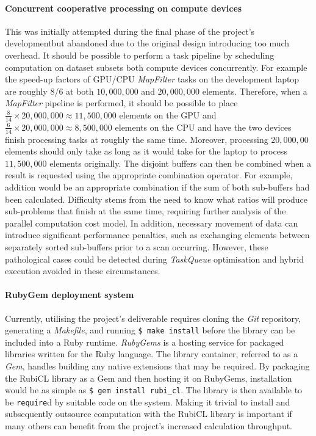 \paragraph*{Concurrent cooperative processing on compute devices} This was initially attempted during the final phase of the project's developmentbut abandoned due to the original design introducing too much overhead. It should be possible to perform a task pipeline by scheduling computation on dataset subsets both compute devices concurrently. For example the speed-up factors of \ac{GPU}/\ac{CPU} \emph{MapFilter} tasks on the development laptop are roughly $8$/$6$ at both $10,000,000$ and $20,000,000$ elements. Therefore, when a \emph{MapFilter} pipeline is performed, it should be possible to place $\frac{8}{14} \times 20,000,000 \approx 11,500,000$ elements on the \ac{GPU} and $\frac{6}{14} \times 20,000,000 \approx 8,500,000$ elements on the \ac{CPU} and have the two devices finish processing tasks at roughly the same time. Moreover, processing $20,000,00$ elements should only take as long as it would take for the laptop to process $11,500,000$ elements originally. The disjoint buffers can then be combined when a result is requested using the appropriate combination operator. For example, addition would be an appropriate combination if the sum of both sub-buffers had been calculated. Difficulty stems from the need to know what ratios will produce sub-problems that finish at the same time, requiring further analysis of the parallel computation cost model. In addition, necessary movement of data can introduce significant performance penalties, such as exchanging elements between separately sorted sub-buffers prior to a scan occurring. However, these pathological cases could be detected during \emph{TaskQueue} optimisation and hybrid execution avoided in these circumstances.

\paragraph*{RubyGem deployment system}
Currently, utilising the project's deliverable requires cloning the \emph{Git} repository, generating a \emph{Makefile}, and running \verb|$ make install| before the library can be included into a Ruby runtime.
\emph{RubyGems}\cite{rubygems} is a hosting service for packaged libraries written for the Ruby language. The library container, referred to as a \emph{Gem}, handles building any native extensions that may be required.
By packaging the RubiCL library as a Gem and then hosting it on RubyGems, installation would be as simple as \verb|$ gem install rubi_cl|. The library is then available to be \verb|require|d by suitable code on the system. Making it trivial to install and subsequently outsource computation with the RubiCL library is important if many others can benefit from the project's increased calculation throughput.
